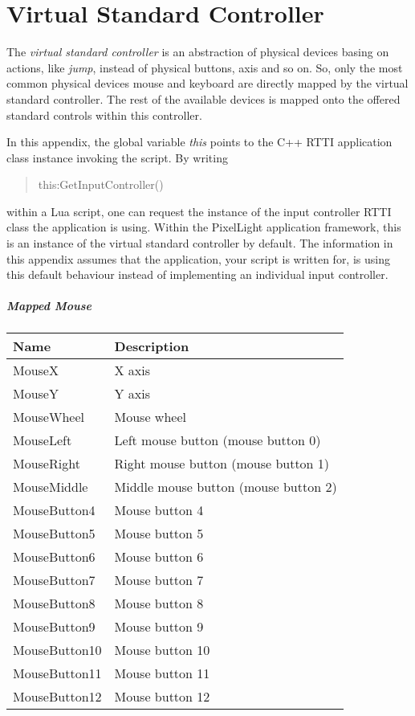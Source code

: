 \chapter{Virtual Standard Controller}
\label{Appendix:VirtualStandardController}
The \emph{virtual standard controller} is an abstraction of physical devices basing on actions, like \emph{jump}, instead of physical buttons, axis and so on. So, only the most common physical devices mouse and keyboard are directly mapped by the virtual standard controller. The rest of the available devices is mapped onto the offered standard controls within this controller.

In this appendix, the global variable \emph{this} points to the C++ \ac{RTTI} application class instance invoking the script. By writing \begin{quote}this:GetInputController()\end{quote} within a Lua script, one can request the instance of the input controller \ac{RTTI} class the application is using. Within the PixelLight application framework, this is an instance of the virtual standard controller by default. The information in this appendix assumes that the application, your script is written for, is using this default behaviour instead of implementing an individual input controller.


\paragraph{Mapped Mouse}
\begin{center}
	\centering
	\begin{longtable}{ | l | p{10cm} |}
	\hline
	Name	& Description\\ \hline
	MouseX			&	X axis\\
	MouseY			&	Y axis\\
	MouseWheel		&	Mouse wheel\\
	MouseLeft		&	Left mouse button (mouse button 0)\\
	MouseRight		&	Right mouse button (mouse button 1)\\
	MouseMiddle		&	Middle mouse button (mouse button 2)\\
	MouseButton4	&	Mouse button 4\\
	MouseButton5	&	Mouse button 5\\
	MouseButton6	&	Mouse button 6\\
	MouseButton7	&	Mouse button 7\\
	MouseButton8	&	Mouse button 8\\
	MouseButton9	&	Mouse button 9\\
	MouseButton10	&	Mouse button 10\\
	MouseButton11	&	Mouse button 11\\
	MouseButton12	& 	Mouse button 12\\
	\hline
	\end{longtable}
\end{center}


